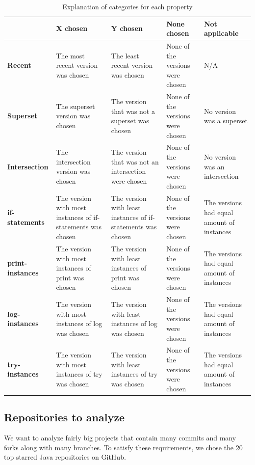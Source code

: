 \begin{table}
\caption{Explanation of categories for each property}\label{table:pproperties2}
\begin{tabularx}{\textwidth}{| X | X | X | X | X |}
\hline & \textbf{X chosen} & \textbf{Y chosen} & \textbf{None chosen} & \textbf{Not applicable}\\
\hline
\textbf{Recent} & The most recent version was chosen & The least recent version was chosen & None of the versions were chosen & N/A\\
\hline
\textbf{Superset} & The superset version was chosen & The version that was not a superset was chosen & None of the versions were chosen & No version was a superset\\
\hline
\textbf{Intersection} & The intersection version was chosen & The version that was not an intersection were chosen & None of the versions were chosen & No version was an
intersection\\
\hline
\textbf{if-statements} & The version with most instances of if-statements was chosen & The version with least instances of if-statements was chosen & None of the versions were chosen & The versions had equal amount of instances\\
\hline
\textbf{print-instances} & The version with most instances of print was chosen & The version with least instances of print was chosen & None of the versions were chosen & The versions had equal amount of instances\\
\hline
\textbf{log-instances} & The version with most instances of log was chosen & The version with least instances of log was chosen & None of the versions were chosen & The versions had equal amount of instances\\
\hline
\textbf{try-instances} & The version with most instances of try was chosen & The version with least instances of try was chosen & None of the versions were chosen & The versions had equal amount of instances\\
\hline
\end{tabularx}
\end{table}
\FloatBarrier
\subsection{Repositories to analyze}
We want to analyze fairly big projects that contain many commits and many forks along with many branches. To satisfy these requirements, we chose the 20 top starred Java repositories on GitHub.

